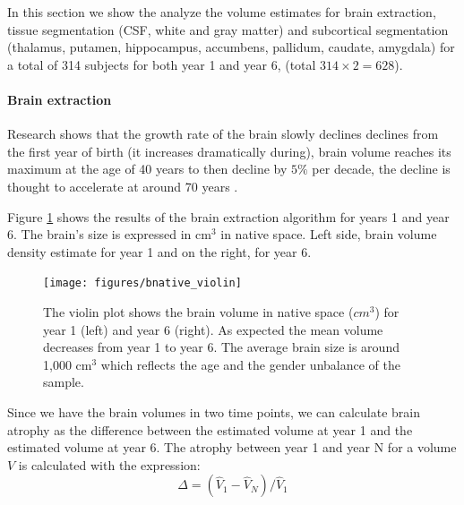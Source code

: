 \documentclass[11pt]{article}
\theoremstyle{definition}
\theoremstyle{remark}
\begin{document}
In this section we show the analyze the volume estimates for brain extraction, tissue segmentation (CSF, white and gray matter) and subcortical segmentation (thalamus, putamen, hippocampus, accumbens, pallidum, caudate, amygdala) for a total of 314 subjects for both year 1 and year 6, (total $314 \times 2 = 628$).

\paragraph*{Brain extraction}

Research shows that the growth rate of the brain slowly declines declines from the first year of birth (it increases dramatically during), brain volume reaches its maximum at the age of 40 years to then decline by $5\%$ per decade, the decline is thought to accelerate at around 70 years \cite{peters2006ageing}.

Figure \ref{fig:brainviolin} shows the results of the brain extraction algorithm for years 1 and year 6. The brain's size is expressed in cm${^3}$ in native space. Left side, brain volume density estimate for year 1 and on the right, for year 6.

\begin{figure}[!htb]
        \centering
        \texttt{[image: figures/bnative\_violin]}
        \caption{The violin plot shows the brain volume in native space ($cm^3$) for year 1 (left) and year 6 (right). As expected the mean volume decreases from  year 1 to year 6. The average brain size is around 1,000 cm${^3}$ which reflects the age and the gender unbalance of the sample.} 
        \label{fig:brainviolin}
\end{figure}

Since we have the brain volumes in two time points, we can calculate brain atrophy as the difference between the estimated volume at year 1 and the estimated volume at year 6. 
The atrophy between year 1 and year N for a volume $V$ is calculated with the expression:
\begin{equation}
\Delta = (\hat{V}_1 - \hat{V}_N)/ \hat{V}_1
\label{eq:atro}
\end{equation}
\end{document}
